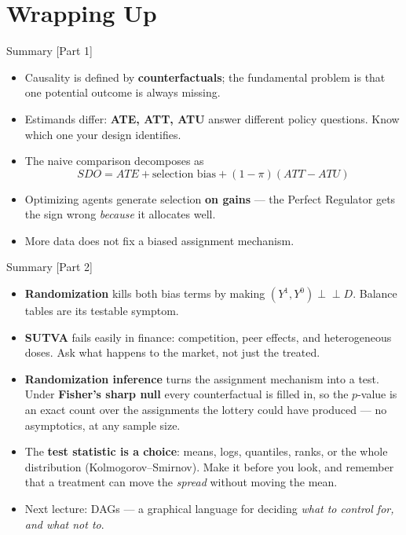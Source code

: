 \documentclass[
  11pt,
  ignorenonframetext,
  aspectratio=169,
]{beamer}
\providecommand{\tightlist}{%
  \setlength{\itemsep}{0pt}\setlength{\parskip}{0pt}}
\newcommand{\indep}{\perp\!\!\!\perp}
\begin{document}
\section{Wrapping Up}\label{wrapping-up}

\begin{frame}{Summary {[}Part 1{]}}
\protect{}\label{summary-part-1}
\begin{itemize}
\tightlist
\item
  Causality is defined by \textbf{counterfactuals}; the fundamental
  problem is that one potential outcome is always missing.
\item
  Estimands differ: \textbf{ATE, ATT, ATU} answer different policy
  questions. Know which one your design identifies.
\item
  The naive comparison decomposes as \[
  SDO = ATE + \text{selection bias} + (1-\pi)(ATT - ATU)
  \]
\item
  Optimizing agents generate selection \textbf{on gains} --- the Perfect
  Regulator gets the sign wrong \emph{because} it allocates well.
\item
  More data does not fix a biased assignment mechanism.
\end{itemize}
\end{frame}

\begin{frame}{Summary {[}Part 2{]}}
\protect{}\label{summary-part-2}
\begin{itemize}
\tightlist
\item
  \textbf{Randomization} kills both bias terms by making
  \((Y^1, Y^0) \indep D\). Balance tables are its testable symptom.
\item
  \textbf{SUTVA} fails easily in finance: competition, peer effects, and
  heterogeneous doses. Ask what happens to the market, not just the
  treated.
\item
  \textbf{Randomization inference} turns the assignment mechanism into a
  test. Under \textbf{Fisher's sharp null} every counterfactual is
  filled in, so the \(p\)-value is an exact count over the assignments
  the lottery could have produced --- no asymptotics, at any sample
  size.
\item
  The \textbf{test statistic is a choice}: means, logs, quantiles,
  ranks, or the whole distribution (Kolmogorov--Smirnov). Make it before
  you look, and remember that a treatment can move the \emph{spread}
  without moving the mean.
\item
  Next lecture: DAGs --- a graphical language for deciding \emph{what to
  control for, and what not to}.
\end{itemize}
\end{frame}
\end{document}
